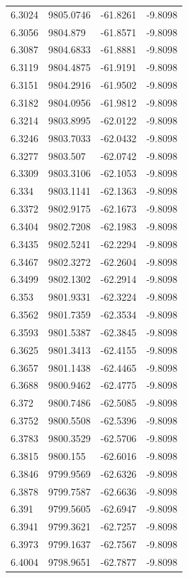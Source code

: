 \begin{table}[H]
\begin{tabular}{llll}
6.3024 & 9805.0746 & -61.8261 & -9.8098 \\
6.3056 & 9804.879 & -61.8571 & -9.8098 \\
6.3087 & 9804.6833 & -61.8881 & -9.8098 \\
6.3119 & 9804.4875 & -61.9191 & -9.8098 \\
6.3151 & 9804.2916 & -61.9502 & -9.8098 \\
6.3182 & 9804.0956 & -61.9812 & -9.8098 \\
6.3214 & 9803.8995 & -62.0122 & -9.8098 \\
6.3246 & 9803.7033 & -62.0432 & -9.8098 \\
6.3277 & 9803.507 & -62.0742 & -9.8098 \\
6.3309 & 9803.3106 & -62.1053 & -9.8098 \\
6.334 & 9803.1141 & -62.1363 & -9.8098 \\
6.3372 & 9802.9175 & -62.1673 & -9.8098 \\
6.3404 & 9802.7208 & -62.1983 & -9.8098 \\
6.3435 & 9802.5241 & -62.2294 & -9.8098 \\
6.3467 & 9802.3272 & -62.2604 & -9.8098 \\
6.3499 & 9802.1302 & -62.2914 & -9.8098 \\
6.353 & 9801.9331 & -62.3224 & -9.8098 \\
6.3562 & 9801.7359 & -62.3534 & -9.8098 \\
6.3593 & 9801.5387 & -62.3845 & -9.8098 \\
6.3625 & 9801.3413 & -62.4155 & -9.8098 \\
6.3657 & 9801.1438 & -62.4465 & -9.8098 \\
6.3688 & 9800.9462 & -62.4775 & -9.8098 \\
6.372 & 9800.7486 & -62.5085 & -9.8098 \\
6.3752 & 9800.5508 & -62.5396 & -9.8098 \\
6.3783 & 9800.3529 & -62.5706 & -9.8098 \\
6.3815 & 9800.155 & -62.6016 & -9.8098 \\
6.3846 & 9799.9569 & -62.6326 & -9.8098 \\
6.3878 & 9799.7587 & -62.6636 & -9.8098 \\
6.391 & 9799.5605 & -62.6947 & -9.8098 \\
6.3941 & 9799.3621 & -62.7257 & -9.8098 \\
6.3973 & 9799.1637 & -62.7567 & -9.8098 \\
6.4004 & 9798.9651 & -62.7877 & -9.8098 \\

\end{tabular}
\end{table}
